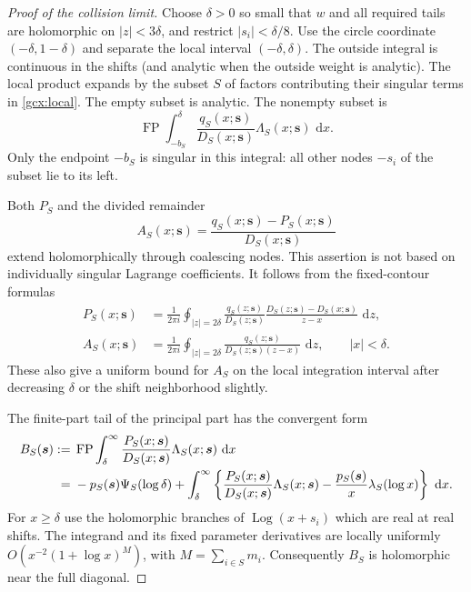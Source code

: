 \documentclass[11pt]{article}
\numberwithin{equation}{section}
\theoremstyle{plain}
\theoremstyle{definition}
\theoremstyle{remark}
\DeclareMathOperator{\Log}{Log}
\DeclareMathOperator{\FP}{FP}
\newcommand{\dd}{\,\mathrm d}
\begin{document}
\begin{proof}[Proof of the collision limit]
Choose $\delta>0$ so small that $w$ and all required tails are holomorphic
on $|z|<3\delta$, and restrict $|s_i|<\delta/8$.  Use the circle coordinate
$(-\delta,1-\delta)$ and separate the local interval
$(-\delta,\delta)$.  The outside integral is continuous in the shifts
(and analytic when the outside weight is analytic).  The local product
expands by the subset $S$ of factors contributing their singular terms in
\eqref{gcx:local}.  The empty subset is analytic.  The nonempty subset is
\begin{equation}\label{gcx:local-subset}
 \FP\int_{-b_S}^{\delta}
        \frac{q_S(x;\boldsymbol s)}{D_S(x;\boldsymbol s)}
                  \Lambda_S(x;\boldsymbol s)\,\dd x.
\end{equation}
Only the endpoint $-b_S$ is singular in this integral: all other nodes
$-s_i$ of the subset lie to its left.

Both $P_S$ and the divided remainder
\[
 A_S(x;\boldsymbol s)=\frac{q_S(x;\boldsymbol s)-P_S(x;\boldsymbol s)}
                           {D_S(x;\boldsymbol s)}
\]
extend holomorphically through coalescing nodes.  This assertion is not
based on individually singular Lagrange coefficients.  It follows from
the fixed-contour formulas
\begin{align}
 P_S(x;\boldsymbol s)&=\frac1{2\pi i}\oint_{|z|=2\delta}
 \frac{q_S(z;\boldsymbol s)}{D_S(z;\boldsymbol s)}
 \frac{D_S(z;\boldsymbol s)-D_S(x;\boldsymbol s)}{z-x}\,\dd z,
 \label{gcx:Hermite-contour}\\
 A_S(x;\boldsymbol s)&=\frac1{2\pi i}\oint_{|z|=2\delta}
 \frac{q_S(z;\boldsymbol s)}{D_S(z;\boldsymbol s)(z-x)}\,\dd z,
 \qquad |x|<\delta.
 \label{gcx:remainder-contour}
\end{align}
These also give a uniform bound for $A_S$ on the local integration
interval after decreasing $\delta$ or the shift neighborhood slightly.

The finite-part tail of the principal part has the convergent form
\begin{align}
 B_S(\boldsymbol s):={}&\FP\int_\delta^\infty
      \frac{P_S(x;\boldsymbol s)}{D_S(x;\boldsymbol s)}
                  \Lambda_S(x;\boldsymbol s)\,\dd x\notag\\
 ={}&-p_S(\boldsymbol s)\Psi_S(\log\delta)
 +\int_\delta^\infty\left\{
      \frac{P_S(x;\boldsymbol s)}{D_S(x;\boldsymbol s)}
                    \Lambda_S(x;\boldsymbol s)
       -\frac{p_S(\boldsymbol s)}x\lambda_S(\log x)\right\}\,\dd x.
 \label{gcx:tail}
\end{align}
For $x\ge\delta$ use the holomorphic branches of $\Log(x+s_i)$ which are
real at real shifts.  The integrand and its fixed parameter derivatives
are locally uniformly $O(x^{-2}(1+\log x)^M)$, with
$M=\sum_{i\in S}m_i$.  Consequently $B_S$ is holomorphic near the full
diagonal.


\end{proof}
\end{document}
